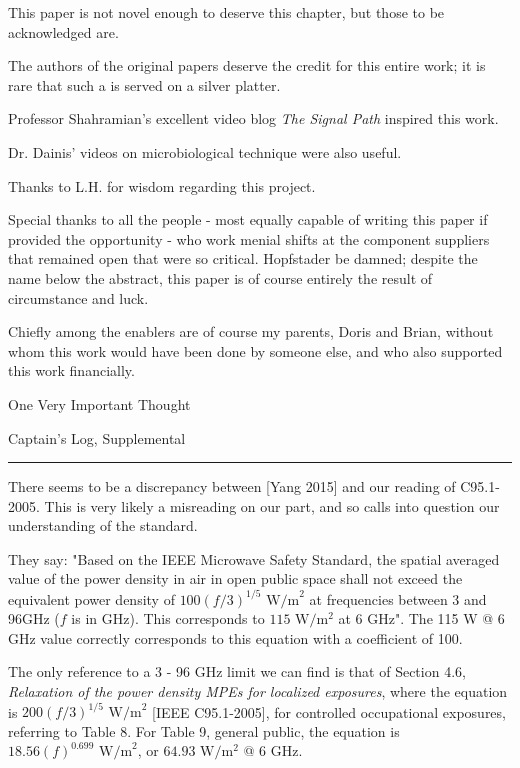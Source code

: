 \documentclass[fleqn,10pt]{article}
\begin{document}
This paper is not novel enough to deserve this chapter, but those to be acknowledged are.

The authors of the original papers deserve the credit for this entire work; it is rare that such a is served on a silver platter.

Professor Shahramian's excellent video blog {\it The Signal Path} inspired this work. 

Dr. Dainis' videos on microbiological technique were also useful.

Thanks to L.H. for wisdom regarding this project.

Special thanks to all the people - most equally capable of writing this paper if provided the opportunity - who work menial shifts at the component suppliers that remained open that were so critical. Hopfstader be damned; despite the name below the abstract, this paper is of course entirely the result of circumstance and luck. 

Chiefly among the enablers are of course my parents, Doris and Brian, without whom this work would have been done by someone else, and who also supported this work financially. 



One Very Important Thought













\clearpage
{\Large Captain's Log, Supplemental}\\

\rule{\linewidth}{0.2pt}

There seems to be a discrepancy between [Yang 2015] and our reading of C95.1-2005. This is very likely a misreading on our part, and so calls into question our understanding of the standard.

They say: "Based on the IEEE Microwave Safety Standard, the spatial averaged value of the power density in air in open public space shall not exceed the equivalent power density of $100(f/3)^{1/5} \text{ W/m}^2$ at frequencies between 3 and 96GHz ($f$ is in GHz). This corresponds to $115 \text{ W}/\text{m}^2$ at 6 GHz". The 115 W @ 6 GHz value correctly corresponds to this equation with a coefficient of 100.

The only reference to a 3 - 96 GHz limit we can find is that of Section 4.6, {\it Relaxation of the power density MPEs for localized exposures}, where the equation is $200 (f/3)^{1/5} \text{ W/m}^2$ [IEEE C95.1-2005], for controlled occupational exposures, referring to Table 8. For Table 9, general public, the equation is $18.56 (f)^{0.699} \text{ W/m}^2$, or $64.93 \text{ W}/\text{m}^2$ @ 6 GHz. 
\end{document}
